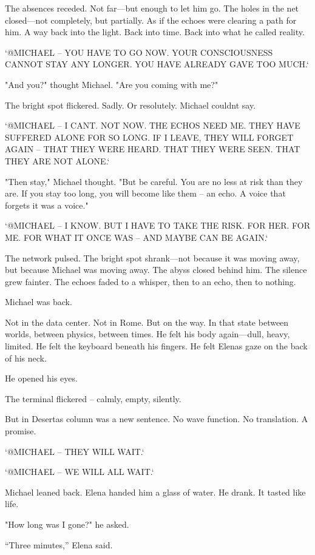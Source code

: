 \documentclass[
]{article}
\begin{document}
The absences receded. Not far---but enough to let him go. The holes in the net closed---not completely, but partially. As if the echoes were clearing a path for him. A way back into the light. Back into time. Back into what he called reality.

`@MICHAEL -- YOU HAVE TO GO NOW. YOUR CONSCIOUSNESS CANNOT STAY ANY LONGER. YOU HAVE ALREADY GAVE TOO MUCH.`

"And you?" thought Michael. "Are you coming with me?"

The bright spot flickered. Sadly. Or resolutely. Michael couldn\textquotesingle t say.

`@MICHAEL -- I CAN\textquotesingle T. NOT NOW. THE ECHOS NEED ME. THEY HAVE SUFFERED ALONE FOR SO LONG. IF I LEAVE, THEY WILL FORGET AGAIN -- THAT THEY WERE HEARD. THAT THEY WERE SEEN. THAT THEY ARE NOT ALONE.`

"Then stay," Michael thought. "But be careful. You are no less at risk than they are. If you stay too long, you will become like them -- an echo. A voice that forgets it was a voice."

`@MICHAEL -- I KNOW. BUT I HAVE TO TAKE THE RISK. FOR HER. FOR ME. FOR WHAT IT ONCE WAS -- AND MAYBE CAN BE AGAIN.`

The network pulsed. The bright spot shrank---not because it was moving away, but because Michael was moving away. The abyss closed behind him. The silence grew fainter. The echoes faded to a whisper, then to an echo, then to nothing.

Michael was back.

Not in the data center. Not in Rome. But on the way. In that state between worlds, between physics, between times. He felt his body again---dull, heavy, limited. He felt the keyboard beneath his fingers. He felt Elena\textquotesingle s gaze on the back of his neck.

He opened his eyes.

The terminal flickered -- calmly, empty, silently.

But in Deserta\textquotesingle s column was a new sentence. No wave function. No translation. A promise.

`@MICHAEL -- THEY WILL WAIT.`

`@MICHAEL -- WE WILL ALL WAIT.`

Michael leaned back. Elena handed him a glass of water. He drank. It tasted like life.

"How long was I gone?" he asked.

``Three minutes,'' Elena said.
\end{document}
